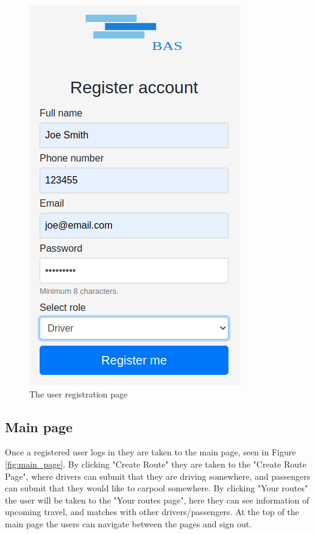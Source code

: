 \documentclass{article}
\begin{document}
\begin{figure}[h!]
    \centering
    \includegraphics[scale=0.5]{ssdFigures/register.png}
    \caption{The user registration page}
    \label{fig:register}
\end{figure}

\clearpage
\newpage
\subsection{Main page}
Once a registered user logs in they are taken to the main page, seen in Figure \ref{fig:main_page}. By clicking "Create Route" they are taken to the "Create Route Page", where drivers can submit that they are driving somewhere, and passengers can submit that they would like to carpool somewhere. By clicking "Your routes" the user will be taken to the "Your routes page", here they can see information of upcoming travel, and matches with other drivers/passengers. At the top of the main page the users can navigate between the pages and sign out.
\end{document}
